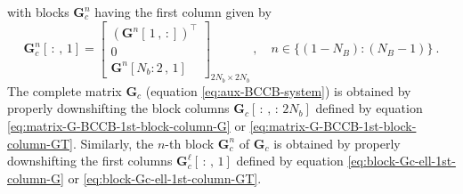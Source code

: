 \documentclass[utf8]{FrontiersinHarvard} %
\begin{document}
	with blocks $\mathbf{G}_{c}^{n}$ having the first column given by
	\begin{equation}
		\mathbf{G}_{c}^{n}[ \, : \, , \, 1] = \begin{bmatrix}
			\left( \mathbf{G}^{n}[ \, 1 \, , \, :] \right)^{\top} \\ 
			0 \\ 
			\mathbf{G}^{n}[ N_{b}:2 \, , \, 1 ]
		\end{bmatrix}_{2N_{b} \times 2N_{b}} \: , \quad n \in \{(1-N_{B}):(N_{B}-1)\} \: .
		\label{eq:block-Gc-ell-1st-column-GT}
	\end{equation}
	The complete matrix $\mathbf{G}_{c}$ (equation \ref{eq:aux-BCCB-system}) is obtained by properly downshifting 
	the block columns $\mathbf{G}_{c}[ \, : \, , \, : \, 2N_{b}]$ defined by equation \ref{eq:matrix-G-BCCB-1st-block-column-G}
	or \ref{eq:matrix-G-BCCB-1st-block-column-GT}.
	Similarly, the $n$-th block $\mathbf{G}_{c}^{n}$ of $\mathbf{G}_{c}$ is obtained by properly
	downshifting the first columns $\mathbf{G}_{c}^{\ell}[ \, : \, , \, 1]$ defined by equation  
	\ref{eq:block-Gc-ell-1st-column-G} or \ref{eq:block-Gc-ell-1st-column-GT}.
	
\end{document}
